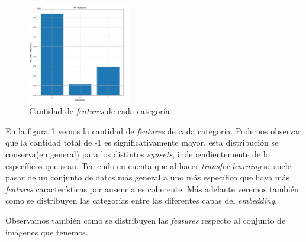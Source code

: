 \documentclass[12,twoside]{TFG-GM}
\theoremstyle{definition}
\theoremstyle{remark}
\begin{document}
\begin{figure}[ht] 
	\centering
	\includegraphics[width=0.4\textwidth] {Images/plots/25/quantity_of_features_bar.png}
	\caption{ Cantidad de \textit{features} de cada categoría
	\label{fig:totalfeatures}}


\end{figure}

En la figura \ref{fig:totalfeatures} vemos la cantidad de \textit{features} de cada categoría. Podemos observar que la cantidad total de -1 es significativamente mayor, esta distribución se conserva(en general) para los distintos \textit{synsets}, independientemente de lo específicos que sean. Teniendo en cuenta que al hacer \textit{transfer learning} se suele pasar de un conjunto de datos más general a uno más específico que haya más \textit{features} características por ausencia es coherente. Más adelante veremos también como se distribuyen las categorías entre las diferentes capas del \textit{embedding}. 


Observamos también como se distribuyen las \textit{features} respecto al conjunto de imágenes que tenemos. 
\end{document}
